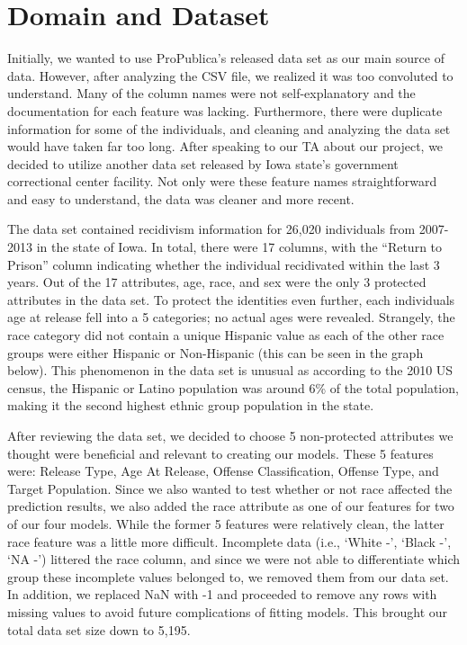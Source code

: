 \documentclass[11pt, sigconf]{acmart}
\begin{document}
\section{Domain and Dataset}

\hspace{5mm}Initially, we wanted to use ProPublica's released data set as our main source of data. However, after analyzing the CSV file, we realized it was too convoluted to understand. Many of the column names were not self-explanatory and the documentation for each feature was lacking. Furthermore, there were duplicate information for some of the individuals, and cleaning and analyzing the data set would have taken far too long. After speaking to our TA about our project, we decided to utilize another data set released by Iowa state's government correctional center facility. Not only were these feature names straightforward and easy to understand, the data was cleaner and more recent. 

The data set contained recidivism information for 26,020 individuals from 2007-2013 in the state of Iowa. In total, there were 17 columns, with the ``Return to Prison'' column indicating whether the individual recidivated within the last 3 years. Out of the 17 attributes, age, race, and sex were the only 3 protected attributes in the data set. To protect the identities even further, each individuals age at release fell into a 5 categories; no actual ages were revealed. Strangely, the race category did not contain a unique Hispanic value as each of the other race groups were either Hispanic or Non-Hispanic (this can be seen in the graph below). This phenomenon in the data set is unusual as according to the 2010 US census, the Hispanic or Latino population was around 6\% of the total population, making it the second highest ethnic group population in the state.\cite{2}

After reviewing the data set, we decided to choose 5 non-protected attributes we thought were beneficial and relevant to creating our models. These 5 features were: Release Type, Age At Release, Offense Classification, Offense Type, and Target Population. Since we also wanted to test whether or not race affected the prediction results, we also added the race attribute as one of our features for two of our four models. While the former 5 features were relatively clean, the latter race feature was a little more difficult. Incomplete data (i.e., ‘White -’, ‘Black -’, ‘NA -’) littered the race column, and since we were not able to differentiate which group these incomplete values belonged to, we removed them from our data set. In addition, we replaced NaN with -1 and proceeded to remove any rows with missing values to avoid future complications of fitting models. This brought our total data set size down to 5,195.
\end{document}
